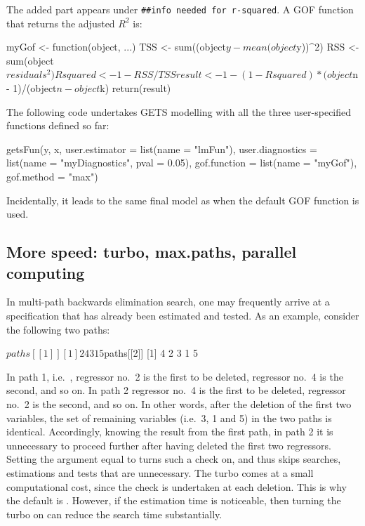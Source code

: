 %
The added part appears under \verb|##info needed for r-squared|. A GOF function that returns the adjusted $R^2$ is:
%
\begin{example}
  myGof <- function(object, ...){
    TSS <- sum((object$y - mean(object$y))^2)
    RSS <- sum(object$residuals^2)
    Rsquared <- 1 - RSS/TSS
    result <- 1 - (1 - Rsquared) * (object$n - 1)/(object$n - object$k)
    return(result)
  }
\end{example}
%
The following code undertakes GETS modelling with all the three user-specified functions defined so far:
%
\begin{example}
  getsFun(y, x, user.estimator = list(name = "lmFun"),
    user.diagnostics = list(name = "myDiagnostics", pval = 0.05),
    gof.function = list(name = "myGof"), gof.method = "max")
\end{example}
%
Incidentally, it leads to the same final model as when the default GOF function is used.

\subsection{More speed: turbo, max.paths, parallel computing}

In multi-path backwards elimination search, one may frequently arrive at a specification that has already been estimated and tested. As an example, consider the following two paths:
%
\begin{example}
  $paths[[1]]
  [1]  2 4 3 1 5

  $paths[[2]]
  [1]  4 2 3 1 5
\end{example}
%
In path 1, i.e.\ , regressor no.\ 2 is the first to be deleted, regressor no.\ 4 is the second, and so on. In path 2 regressor no.\ 4 is the first to be deleted, regressor no.\ 2 is the second, and so on. In other words, after the deletion of the first two variables, the set of remaining variables (i.e.\ 3, 1 and 5) in the two paths is identical. Accordingly, knowing the result from the first path, in path 2 it is unnecessary to proceed further after having deleted the first two regressors. Setting the argument  equal to  turns such a check on, and thus skips searches, estimations and tests that are unnecessary. The turbo comes at a small computational cost, since the check is undertaken at each deletion. This is why the default is . However, if the estimation time is noticeable, then turning the turbo on can reduce the search time substantially.

